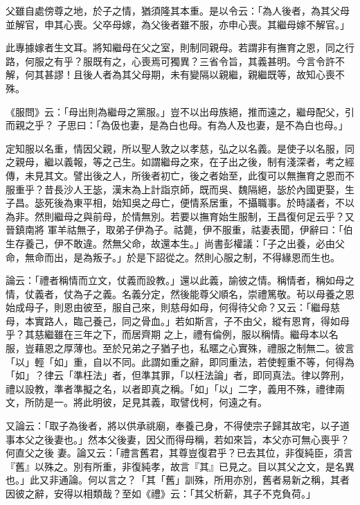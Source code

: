 \begin{pinyinscope}
 父雖自處傍尊之地，於子之情，猶須隆其本重。是以令云：「為人後者，為其父母並解官，申其心喪。父卒母嫁，為父後者雖不服，亦申心喪。其繼母嫁不解官。」



 此專據嫁者生文耳。將知繼母在父之室，則制同親母。若謂非有撫育之恩，同之行路，何服之有乎？服既有之，心喪焉可獨異？三省令旨，其義甚明。今言令許不解，何其甚謬！且後人者為其父母期，未有變隔以親繼，親繼既等，故知心喪不殊。



 《服問》云：「母出則為繼母之黨服。」豈不以出母族絕，推而遠之，繼母配父，引而親之乎？
 子思曰：「為伋也妻，是為白也母。有為人及也妻，是不為白也母。」



 定知服以名重，情因父親，所以聖人敦之以孝慈，弘之以名義。是使子以名服，同之親母，繼以義報，等之己生。如謂繼母之來，在子出之後，制有淺深者，考之經傳，未見其文。譬出後之人，所後者初亡，後之者始至，此復可以無撫育之恩而不服重乎？昔長沙人王毖，漢末為上計詣京師，既而吳、魏隔絕，毖於內國更娶，生子昌。毖死後為東平相，始知吳之母亡，便情系居重，不攝職事。於時議者，不以為非。然則繼母之與前母，於情無別。若要以撫育始生服制，王昌復何足云乎？又晉鎮南將
 軍羊祜無子，取弟子伊為子。祜薨，伊不服重，祜妻表聞，伊辭曰：「伯生存養己，伊不敢違。然無父命，故還本生。」尚書彭權議：「子之出養，必由父命，無命而出，是為叛子。」於是下詔從之。然則心服之制，不得緣恩而生也。



 論云：「禮者稱情而立文，仗義而設教。」還以此義，諭彼之情。稱情者，稱如母之情，仗義者，仗為子之義。名義分定，然後能尊父順名，崇禮篤敬。茍以母養之恩始成母子，則恩由彼至，服自己來，則慈母如母，何得待父命？又云：「繼母慈母，本實路人，臨己養己，同之骨血。」若如斯言，子不由父，縱有恩育，得如母乎？其慈繼雖在三年之下，而居齊期
 之上，禮有倫例，服以稱情。繼母本以名服，豈藉恩之厚薄也。至於兄弟之子猶子也，私暱之心實殊，禮服之制無二。彼言「以」輕「如」重，自以不同。此謂如重之辭，即同重法，若使輕重不等，何得為「如」？律云「準枉法」者，但準其罪，「以枉法論」者，即同真法。律以弊刑，禮以設教，準者準擬之名，以者即真之稱。「如」「以」二字，義用不殊，禮律兩文，所防是一。將此明彼，足見其義，取譬伐柯，何遠之有。



 又論云：「取子為後者，將以供承祧廟，奉養己身，不得使宗子歸其故宅，以子道事本父之後妻也。」然本父後妻，因父而得母稱，若如來旨，本父亦可無心喪乎？何直父之後
 妻。論又云：「禮言舊君，其尊豈復君乎？已去其位，非復純臣，須言『舊』以殊之。別有所重，非復純孝，故言『其』已見之。目以其父之文，是名異也。」此又非通論。何以言之？「其「舊」訓殊，所用亦別，舊者易新之稱，其者因彼之辭，安得以相類哉？至如《禮》云：「其父析薪，其子不克負荷。」




\end{pinyinscope}
